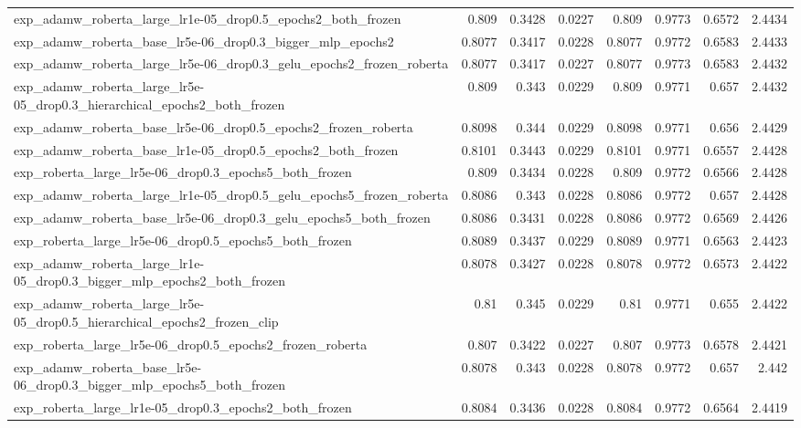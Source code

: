 \documentclass[a4paper,oneside,bibliography=totoc]{scrbook}
\begin{document}
\begin{landscape}
\begin{center}
\begin{longtable}{p{4cm} *{7}{r}}
        exp\_adamw\_roberta\_large\_lr1e-05\_drop0.5\_epochs2\_both\_frozen & 0.809 & 0.3428 & 0.0227 & 0.809 & 0.9773 & 0.6572 & 2.4434 \\ 
        exp\_adamw\_roberta\_base\_lr5e-06\_drop0.3\_bigger\_mlp\_epochs2 & 0.8077 & 0.3417 & 0.0228 & 0.8077 & 0.9772 & 0.6583 & 2.4433 \\ 
        exp\_adamw\_roberta\_large\_lr5e-06\_drop0.3\_gelu\_epochs2\_frozen\_roberta & 0.8077 & 0.3417 & 0.0227 & 0.8077 & 0.9773 & 0.6583 & 2.4432 \\ 
        exp\_adamw\_roberta\_large\_lr5e-05\_drop0.3\_hierarchical\_epochs2\_both\_frozen & 0.809 & 0.343 & 0.0229 & 0.809 & 0.9771 & 0.657 & 2.4432 \\ 
        exp\_adamw\_roberta\_base\_lr5e-06\_drop0.5\_epochs2\_frozen\_roberta & 0.8098 & 0.344 & 0.0229 & 0.8098 & 0.9771 & 0.656 & 2.4429 \\ 
        exp\_adamw\_roberta\_base\_lr1e-05\_drop0.5\_epochs2\_both\_frozen & 0.8101 & 0.3443 & 0.0229 & 0.8101 & 0.9771 & 0.6557 & 2.4428 \\ 
        exp\_roberta\_large\_lr5e-06\_drop0.3\_epochs5\_both\_frozen & 0.809 & 0.3434 & 0.0228 & 0.809 & 0.9772 & 0.6566 & 2.4428 \\ 
        exp\_adamw\_roberta\_large\_lr1e-05\_drop0.5\_gelu\_epochs5\_frozen\_roberta & 0.8086 & 0.343 & 0.0228 & 0.8086 & 0.9772 & 0.657 & 2.4428 \\ 
        exp\_adamw\_roberta\_base\_lr5e-06\_drop0.3\_gelu\_epochs5\_both\_frozen & 0.8086 & 0.3431 & 0.0228 & 0.8086 & 0.9772 & 0.6569 & 2.4426 \\ 
        exp\_roberta\_large\_lr5e-06\_drop0.5\_epochs5\_both\_frozen & 0.8089 & 0.3437 & 0.0229 & 0.8089 & 0.9771 & 0.6563 & 2.4423 \\ 
        exp\_adamw\_roberta\_large\_lr1e-05\_drop0.3\_bigger\_mlp\_epochs2\_both\_frozen & 0.8078 & 0.3427 & 0.0228 & 0.8078 & 0.9772 & 0.6573 & 2.4422 \\ 
        exp\_adamw\_roberta\_large\_lr5e-05\_drop0.5\_hierarchical\_epochs2\_frozen\_clip & 0.81 & 0.345 & 0.0229 & 0.81 & 0.9771 & 0.655 & 2.4422 \\ 
        exp\_roberta\_large\_lr5e-06\_drop0.5\_epochs2\_frozen\_roberta & 0.807 & 0.3422 & 0.0227 & 0.807 & 0.9773 & 0.6578 & 2.4421 \\ 
        exp\_adamw\_roberta\_base\_lr5e-06\_drop0.3\_bigger\_mlp\_epochs5\_both\_frozen & 0.8078 & 0.343 & 0.0228 & 0.8078 & 0.9772 & 0.657 & 2.442 \\ 
        exp\_roberta\_large\_lr1e-05\_drop0.3\_epochs2\_both\_frozen & 0.8084 & 0.3436 & 0.0228 & 0.8084 & 0.9772 & 0.6564 & 2.4419 \\ 

\end{longtable}
\end{center}
\end{landscape}
\end{document}
